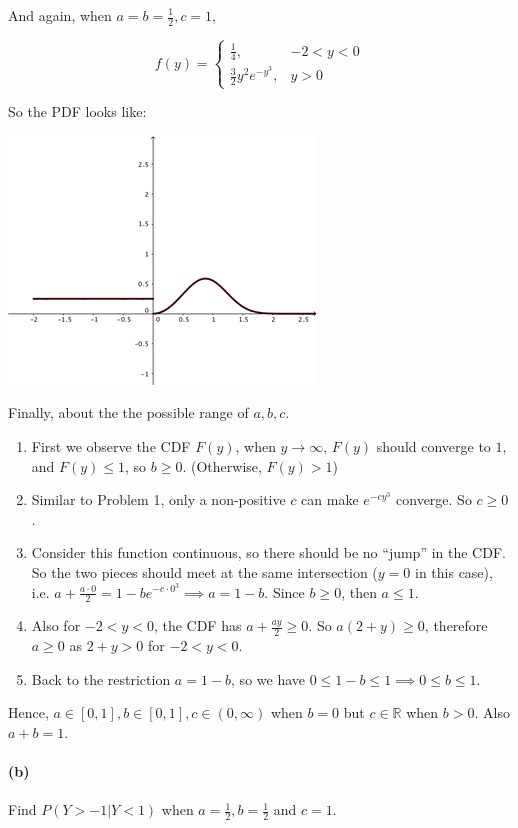 \documentclass[a4paper, 11pt, twoside]{article}
\begin{document}
And again, when $a=b=\frac{1}{2}, c=1$,

\[f(y)=\begin{cases}
	\frac{1}{4}, &-2<y<0\\
	\frac32y^2e^{-y^3}, &y>0
\end{cases}\]

So the PDF looks like:

\includegraphics{image/2a-pdf}

Finally, about the the possible range of $a,b,c$.

\begin{enumerate}
	\item First we observe the CDF $F(y)$, when $y\rightarrow\infty$, $F(y)$ should converge to $1$, and $F(y) \leq 1$, so $b\geq 0$. (Otherwise, $F(y)>1$)
	\item Similar to Problem 1, only a non-positive $c$ can make $e^{-cy^3}$ converge. So $c\geq 0$.
	\item Consider this function continuous, so there should be no ``jump'' in the CDF. So the two pieces should meet at the same intersection ($y=0$ in this case), i.e. $a+\frac{a\cdot 0}{2} = 1-be^{-c\cdot 0^3}\implies a= 1-b$. Since $b\geq 0$, then $a\leq 1$.
	\item Also for $-2<y<0$, the CDF has $a+\frac{ay}{2}\geq 0$. So $a(2+y)\geq 0$, therefore $a\geq 0$ as $2+y > 0$ for $-2<y<0.$
	\item Back to the restriction $a=1-b$, so we have $0\leq 1-b \leq 1 \implies 0\leq b \leq 1.$
\end{enumerate}

Hence, $a\in [0,1], b\in [0, 1], c\in (0, \infty)$ when $b=0$ but $c\in\mathbb{R}$ when $b>0$. Also $a+b=1$.

\paragraph{(b)} Find $P(Y>-1|Y<1)$ when $a=\frac{1}{2}, b=\frac{1}{2}$ and $c=1$.
\end{document}
